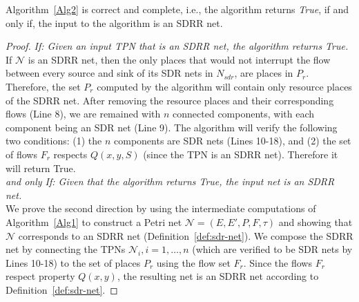 \begin{myprop} \label{prop:corrAlg2}
	Algorithm~\ref{Alg2} is correct and complete, 
	i.e., the algorithm returns \emph{True}, if and only if, the input to the algorithm
	is an SDRR net. 
\end{myprop}
\begin{proof} \noindent \emph{If: Given an input TPN that is an SDRR net, the algorithm returns True.}\\
If $\mathcal{N}$ is an SDRR net, then the only places that would not interrupt the flow between every source 
and sink of its SDR nets in $N_{sdr}$, are places in $P_r$. 
Therefore, the set $P_r$ computed by the algorithm will contain only resource places
of the SDRR net. 
After removing the resource places and their corresponding flows (Line 8),
we are remained with $n$ connected components, with each component being an SDR net (Line 9).
The algorithm will verify the following two conditions: (1) the $n$ components are SDR nets (Lines 10-18),
and (2) the set of flows $F_r$ respects $Q(x,y,S)$ (since the TPN is an SDRR net). Therefore it will return 
True.\\

	
	
\noindent \emph{and only If: Given that the algorithm returns True, the input net is an SDRR net.}\\
We prove the second direction by using the intermediate 
computations
of Algorithm~\ref{Alg1} to construct a Petri net $\mathcal{N} = (E, E',P, F, \tau)$
and showing that $\mathcal{N}$ corresponds to an SDRR net (Definition~\ref{def:sdr-net}). We
compose the SDRR net by 
connecting the TPNs $\mathcal{N}_i, i = 1, \ldots, n$ (which are verified to be SDR nets by Lines 10-18) to the set of places
$P_r$ using the flow set $F_r$. Since the flows $F_r$ respect property $Q(x,y)$, 
the resulting net is an SDRR net according to Definition~\ref{def:sdr-net}.

\end{proof}


